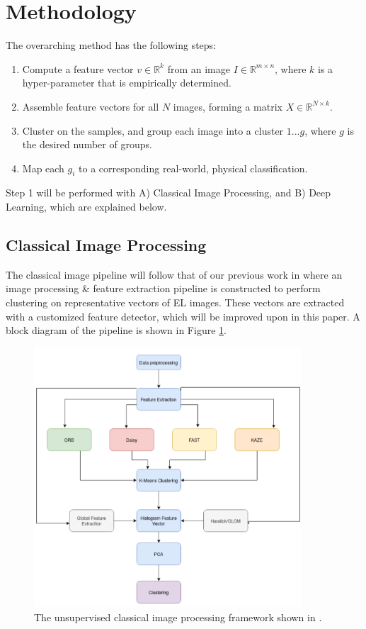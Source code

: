 \documentclass[conference]{IEEEtran}
\newcommand{\R}{\mathbb{R}}
\begin{document}
\section{Methodology}
The overarching method has the following steps:
\begin{enumerate}
    \item Compute a feature vector $v \in \R^k$ from an image $I \in \R^{m \times n}$, where $k$ is a hyper-parameter that is empirically determined. 
    \item Assemble feature vectors for all $N$ images, forming a matrix $X \in \R^{N \times k}$.
    \item Cluster on the samples, and group each image into a cluster $1...g$, where $g$ is the desired number of groups.
    \item Map each $g_i$ to a corresponding real-world, physical classification.
\end{enumerate}
Step 1 will be performed with A) Classical Image Processing, and B) Deep Learning, which are explained below.
\subsection{Classical Image Processing}
The classical image pipeline will follow that of our previous work in \cite{pierce_identifying_2020} where an image processing \& feature extraction pipeline is constructed to perform clustering on representative vectors of EL images. 
These vectors are extracted with a customized feature detector, which will be improved upon in this paper.
A block diagram of the pipeline is shown in Figure \ref{fig:pipeline}.
\begin{figure}[h]
    \includegraphics[width=10cm]{pipeline.png}
    \centering
    \caption{The unsupervised classical image processing framework shown in \cite{pierce_identifying_2020}.}
\label{fig:pipeline}
\end{figure}
\end{document}
